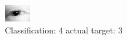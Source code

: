 \begin{figure}[h!]
\begin{center}
\includegraphics[width=0.60\columnwidth]{figures/ID137_class_4_target_3.png}
\end{center}
\caption{ Classification: 4 actual target: 3}
\label{fig:ID137_class_4_target_3}
\end{figure}
